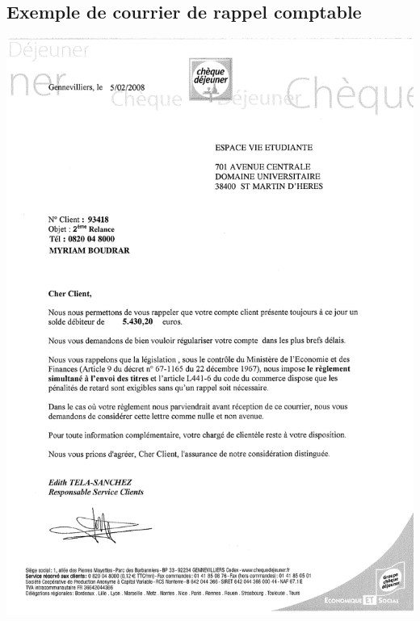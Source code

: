 \subsection{Exemple de courrier de rappel comptable}
\begin{center}
\includegraphics[scale=0.7]{annexes/images/chequedejeuner_rappel.pdf}
\end{center}
